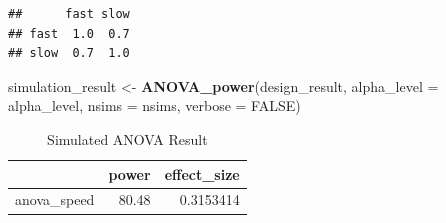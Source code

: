 \documentclass[]{book}
\newenvironment{Shaded}{\begin{snugshade}}{\end{snugshade}}
\newcommand{\DataTypeTok}[1]{\textcolor[rgb]{0.13,0.29,0.53}{#1}}
\newcommand{\FloatTok}[1]{\textcolor[rgb]{0.00,0.00,0.81}{#1}}
\newcommand{\KeywordTok}[1]{\textcolor[rgb]{0.13,0.29,0.53}{\textbf{#1}}}
\newcommand{\NormalTok}[1]{#1}
\newcommand{\OperatorTok}[1]{\textcolor[rgb]{0.81,0.36,0.00}{\textbf{#1}}}
\newcommand{\OtherTok}[1]{\textcolor[rgb]{0.56,0.35,0.01}{#1}}
\newcommand{\StringTok}[1]{\textcolor[rgb]{0.31,0.60,0.02}{#1}}
\begin{document}
\begin{Shaded}
\end{Shaded}

\begin{verbatim}
##      fast slow
## fast  1.0  0.7
## slow  0.7  1.0
\end{verbatim}

\begin{Shaded}
\begin{Highlighting}[]
\NormalTok{simulation_result <-}\StringTok{ }\KeywordTok{ANOVA_power}\NormalTok{(design_result, }
                                 \DataTypeTok{alpha_level =}\NormalTok{ alpha_level, }
                                 \DataTypeTok{nsims =}\NormalTok{ nsims,}
                                 \DataTypeTok{verbose =} \OtherTok{FALSE}\NormalTok{)}
\end{Highlighting}
\end{Shaded}

\begin{table}[!h]

\caption{\label{tab:unnamed-chunk-103}Simulated ANOVA Result}
\centering
\begin{tabular}{l|r|r}
\hline
  & power & effect\_size\\
\hline
anova\_speed & 80.48 & 0.3153414\\
\hline
\end{tabular}
\end{table}
\end{document}
